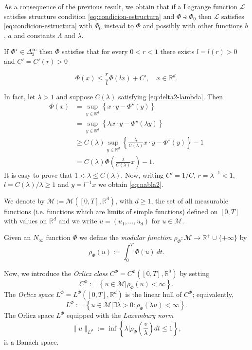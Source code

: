\documentclass[twoside]{article}
\theoremstyle{remark}
\newcommand{\orlnor}{\|_{L^{\Phi}}}
\newcommand{\lphi}{L^{\Phi}}
\newcommand{\claseor}{C^{\Phi}}
\newcommand{\rr}{\mathbb{R}}
\renewcommand{\leq}{\leqslant}
\renewcommand{\geq}{\geqslant}
\begin{document}
As a consequence of the previous result, we obtain that if a Lagrange function $\mathcal{L}$ satisfies structure condition \eqref{eq:condicion-estructura} and $\Phi\strictif \Phi_0$ then $\mathcal{L}$ satisfies \eqref{eq:condicion-estructura} with $\Phi_0$ instead to $\Phi$ and possibly with other functions $b$, $a$ and constants $\Lambda$ and $\lambda$.



If $\Phi^{\star}\in\Delta_2^{\infty}$ then $\Phi$ satisfies that for every $0<r<1$ there exists $l=l(r)>0$ and $C'=C'(r)>0$ 

\begin{equation}\label{eq:nabla2}
  \Phi(x)\leq \frac{r}{l}\Phi(l x)+C',\quad x\in\rr^d.
\end{equation}

In fact, let $\lambda>1$ and suppose $C(\lambda)$ satisfying \eqref{eq:delta2-lambda}.  Then
\[
\begin{split}
\Phi(x)&=\sup_{y \in \rr^d} \left\{x\cdot y -\Phi^{\star}(y)\right\}
\\
&=\sup_{y \in \rr^d} \left\{\lambda x \cdot y -\Phi^{\star}(\lambda y)\right\}
\\
&\geq C(\lambda) \sup_{y \in \rr^d} \left\{ \frac{\lambda}{C(\lambda)}x\cdot y-\Phi^{\star}(y)\right\}-1
\\
&=C(\lambda) \Phi\left(\frac{\lambda}{C(\lambda)}x\right)-1.
\end{split}
\]
It is easy to prove that $1<\lambda\leq C(\lambda)$.
Now, writing $C'=1/C$, $r=\lambda^{-1}<1$, $l=C(\lambda)/\lambda\geq 1$ and $y=l^{-1}x$ we obtain \eqref{eq:nabla2}.




 We denote by $\mathcal{M}:=\mathcal{M}\left([0,T],\rr^d\right)$, with $d\geq 1$,  the set of all measurable functions (i.e. functions which are limits of simple functions)  defined on $[0,T]$ with values on $\mathbb{R}^d$ and  we write $u=(u_1,\dots,u_d)$ for  $u\in \mathcal{M}$.

 Given  an $N_{\infty}$ function $\Phi$ we define the \emph{modular function} 
$\rho_{\Phi}:\mathcal{M}\to \mathbb{R}^+\cup\{+\infty\}$ by
\[\rho_{\Phi}(u):= \int_0^T \Phi(u)\ dt.\]

Now, we introduce the \emph{Orlicz class} $C^{\Phi}=C^{\Phi}\left([0,T],\rr^d\right)$   by setting
\begin{equation}\label{claseOrlicz}
  C^{\Phi}:=\left\{u\in \mathcal{M} | \rho_{\Phi}(u)< \infty \right\}.
\end{equation}
The \emph{Orlicz space} $\lphi=L^{\Phi}\left([0,T],\rr^d\right)$ is the linear hull of $\claseor$;
equivalently,
\begin{equation}\label{espacioOrlicz}
\lphi:=\left\{ u\in \mathcal{M}| \exists \lambda>0: \rho_{\Phi}(\lambda u) < \infty   \right\}.
\end{equation}
  The Orlicz space $\lphi$ equipped with the \emph{Luxemburg norm}
\[
\|  u  \orlnor:=\inf \left\{ \lambda\bigg| \rho_{\Phi}\left(\frac{v}{\lambda}\right) dt\leq 1\right\},
\]
is a Banach space. 
\end{document}
